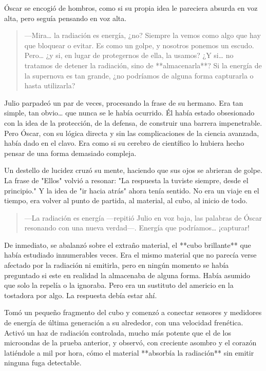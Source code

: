 \documentclass[a4paper,12pt]{book}
\begin{document}
Óscar se encogió de hombros, como si su propia idea le pareciera absurda en voz alta, pero seguía pensando en voz alta.

\begin{quote}
    —Mira… la radiación es energía, ¿no? Siempre la vemos como algo que hay que bloquear o evitar. Es como un golpe, y nosotros ponemos un escudo. Pero… ¿y si, en lugar de protegernos de ella, la usamos? ¿Y si… no tratamos de detener la radiación, sino de **almacenarla**? Si la energía de la supernova es tan grande, ¿no podríamos de alguna forma capturarla o hasta utilizarla?
\end{quote}

Julio parpadeó un par de veces, procesando la frase de su hermano. Era tan simple, tan obvio… que nunca se le había ocurrido. Él había estado obsesionado con la idea de la protección, de la defensa, de construir una barrera impenetrable. Pero Óscar, con su lógica directa y sin las complicaciones de la ciencia avanzada, había dado en el clavo. Era como si su cerebro de científico lo hubiera hecho pensar de una forma demasiado compleja.

Un destello de lucidez cruzó su mente, haciendo que sus ojos se abrieran de golpe. La frase de "Ellos" volvió a resonar: "La respuesta la tuviste siempre, desde el principio." Y la idea de "ir hacia atrás" ahora tenía sentido. No era un viaje en el tiempo, era volver al punto de partida, al material, al cubo, al inicio de todo.

\begin{quote}
    —La radiación es energía —repitió Julio en voz baja, las palabras de Óscar resonando con una nueva verdad—. Energía que podríamos… ¡capturar!
\end{quote}

De inmediato, se abalanzó sobre el extraño material, el **cubo brillante** que había estudiado innumerables veces. Era el mismo material que no parecía verse afectado por la radiación ni emitirla, pero en ningún momento se había preguntado si este en realidad la almacenaba de alguna forma. Había asumido que solo la repelía o la ignoraba. Pero era un sustituto del americio en la tostadora por algo. La respuesta debía estar ahí.

Tomó un pequeño fragmento del cubo y comenzó a conectar sensores y medidores de energía de última generación a su alrededor, con una velocidad frenética. Activó un haz de radiación controlada, mucho más potente que el de los microondas de la prueba anterior, y observó, con creciente asombro y el corazón latiéndole a mil por hora, cómo el material **absorbía la radiación** sin emitir ninguna fuga detectable.
\end{document}
